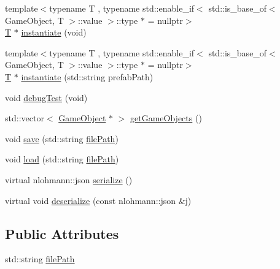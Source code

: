 \begin{DoxyCompactItemize}
{\footnotesize template$<$typename T , typename std\+::enable\+\_\+if$<$ std\+::is\+\_\+base\+\_\+of$<$ Game\+Object, T $>$\+::value $>$\+::type $\ast$  = nullptr$>$ }\\\mbox{\hyperlink{namespace_beer_engine_a94f0b552f6dc910de8cdb44207981f53a8de48e594408f9fc561b2f68ce05f664}{T}} $\ast$ \mbox{\hyperlink{class_beer_engine_1_1_a_scene_a2bd087ae22796d1e286c867f4f1ecc38}{instantiate}} (void)
\item 
{\footnotesize template$<$typename T , typename std\+::enable\+\_\+if$<$ std\+::is\+\_\+base\+\_\+of$<$ Game\+Object, T $>$\+::value $>$\+::type $\ast$  = nullptr$>$ }\\\mbox{\hyperlink{namespace_beer_engine_a94f0b552f6dc910de8cdb44207981f53a8de48e594408f9fc561b2f68ce05f664}{T}} $\ast$ \mbox{\hyperlink{class_beer_engine_1_1_a_scene_acf89d3198589c3e3007b0bc0579dd9ab}{instantiate}} (std\+::string prefab\+Path)
\item 
void \mbox{\hyperlink{class_beer_engine_1_1_a_scene_a44f55dbd991eb07e425ca163f4773766}{debug\+Test}} (void)
\item 
std\+::vector$<$ \mbox{\hyperlink{class_beer_engine_1_1_game_object}{Game\+Object}} $\ast$ $>$ \mbox{\hyperlink{class_beer_engine_1_1_a_scene_ae551bf1b3e7cf87cc2de4b6859732e81}{get\+Game\+Objects}} ()
\item 
void \mbox{\hyperlink{class_beer_engine_1_1_a_scene_a65e03ade02de4673cd25544d4843c6d8}{save}} (std\+::string \mbox{\hyperlink{class_beer_engine_1_1_a_scene_a2edf1030b7232a5f703d327976f1d4ea}{file\+Path}})
\item 
void \mbox{\hyperlink{class_beer_engine_1_1_a_scene_aeedbe75eeef457353645d61a68bc2949}{load}} (std\+::string \mbox{\hyperlink{class_beer_engine_1_1_a_scene_a2edf1030b7232a5f703d327976f1d4ea}{file\+Path}})
\item 
virtual nlohmann\+::json \mbox{\hyperlink{class_beer_engine_1_1_a_scene_ae876ec81592c80e7346f05c56bdaa929}{serialize}} ()
\item 
virtual void \mbox{\hyperlink{class_beer_engine_1_1_a_scene_a3db491adb7ff57a3a527024fd0a6001f}{deserialize}} (const nlohmann\+::json \&j)
\end{DoxyCompactItemize}
\subsection*{Public Attributes}
\begin{DoxyCompactItemize}
\item 
std\+::string \mbox{\hyperlink{class_beer_engine_1_1_a_scene_a2edf1030b7232a5f703d327976f1d4ea}{file\+Path}}
\end{DoxyCompactItemize}
